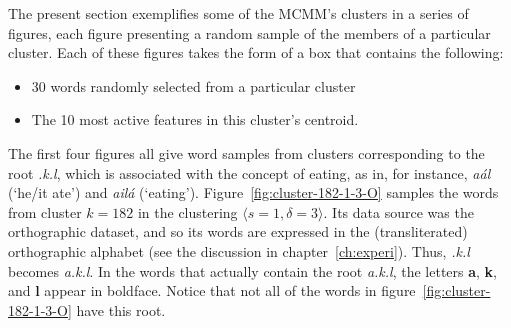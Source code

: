 The present section exemplifies some of the MCMM's clusters in a series of figures, each figure presenting a random sample of the members of a particular cluster. Each of these figures takes the form of a box that contains the following: 
\begin{itemize}
\item 30 words randomly selected from a particular cluster
\item The 10 most active features in this cluster's centroid. 
\end{itemize}
The first four figures all give word samples from clusters corresponding to the root \textit{.k.l}, which is associated with the concept of eating, as in, for instance, \textit{a\'al} (`he/it ate') and \textit{ail\'a} (`eating').
Figure~\ref{fig:cluster-182-1-3-O} samples the words from cluster $k = 182$   
in the clustering $\langle s=1, \delta=3 \rangle$.
Its data source was the orthographic dataset, and so its words are expressed in the (transliterated) orthographic alphabet (see the discussion in chapter~\ref{ch:experi}). Thus, \textit{.k.l} becomes \textit{a.k.l}.
In the words that actually contain the root \textit{a.k.l}, the letters \textbf{a}, \textbf{k}, and \textbf{l} appear in boldface.
Notice that not all of the words in figure~\ref{fig:cluster-182-1-3-O} have this root.

